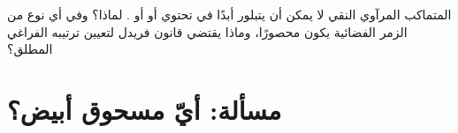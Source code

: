 \begin{exercise}[$\star\star\star$]\label{exo:b3:x-ray-diffraction:12}
المتماكب المرآوي النقي لا يمكن أن يتبلور أبدًا في  تحتوي
 أو  أو . لماذا؟ وفي أي نوع من الزمر الفضائية
يكون محصورًا، وماذا يقتضي قانون فريدل لتعيين ترتيبه الفراغي
المطلق؟
\end{exercise}

\clearpage
\enlargethispage{3\baselineskip}
\section{مسألة: أيّ مسحوق أبيض؟}

